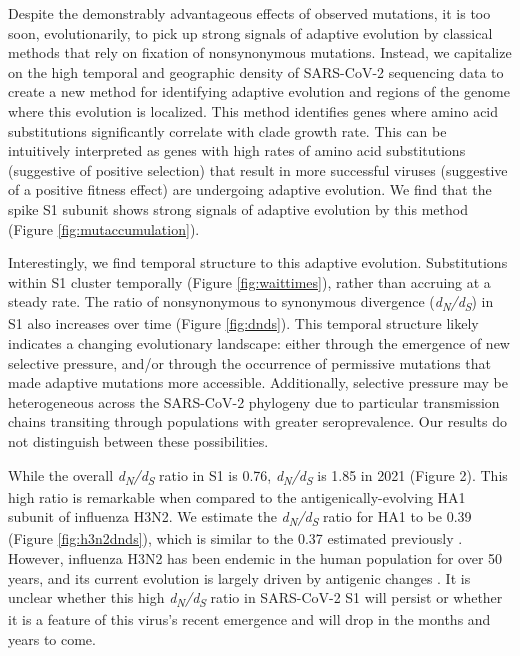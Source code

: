 \documentclass[11pt,oneside,letterpaper]{article}
\begin{document}
Despite the demonstrably advantageous effects of observed mutations, it is too soon, evolutionarily, to pick up strong signals of adaptive evolution by classical methods that rely on fixation of nonsynonymous mutations.
Instead, we capitalize on the high temporal and geographic density of SARS-CoV-2 sequencing data to create a new method for identifying adaptive evolution and regions of the genome where this evolution is localized.
This method identifies genes where amino acid substitutions significantly correlate with clade growth rate.
This can be intuitively interpreted as genes with high rates of amino acid substitutions (suggestive of positive selection) that result in more successful viruses (suggestive of a positive fitness effect) are undergoing adaptive evolution.
We find that the spike S1 subunit shows strong signals of adaptive evolution by this method (Figure \ref{fig:mutaccumulation}).

Interestingly, we find temporal structure to this adaptive evolution. Substitutions within S1 cluster temporally (Figure \ref{fig:waittimes}), rather than accruing at a steady rate.
The ratio of nonsynonymous to synonymous divergence (\emph{d\textsubscript{N}/d\textsubscript{S}}) in S1 also increases over time (Figure \ref{fig:dnds}).
This temporal structure likely indicates a changing evolutionary landscape: either through the emergence of new selective pressure, and/or through the occurrence of permissive mutations that made adaptive mutations more accessible.
Additionally, selective pressure may be heterogeneous across the SARS-CoV-2 phylogeny due to particular transmission chains transiting through populations with greater seroprevalence. Our results do not distinguish between these possibilities.

 While the overall \emph{d\textsubscript{N}/d\textsubscript{S}} ratio in S1 is 0.76, \emph{d\textsubscript{N}/d\textsubscript{S}} is 1.85 in 2021 (Figure 2).
 This high ratio is remarkable when compared to the antigenically-evolving HA1 subunit of influenza H3N2. We estimate the \emph{d\textsubscript{N}/d\textsubscript{S}} ratio for HA1 to be 0.39 (Figure \ref{fig:h3n2dnds}), which is similar to the 0.37 estimated previously \cite{Wolf2006-vy}.
 However, influenza H3N2 has been endemic in the human population for over 50 years, and its current evolution is largely driven by antigenic changes \cite{Smith2004-if}.
 It is unclear whether this high \emph{d\textsubscript{N}/d\textsubscript{S}} ratio in SARS-CoV-2 S1 will persist or whether it is a feature of this virus's recent emergence and will drop in the months and years to come.
\end{document}
